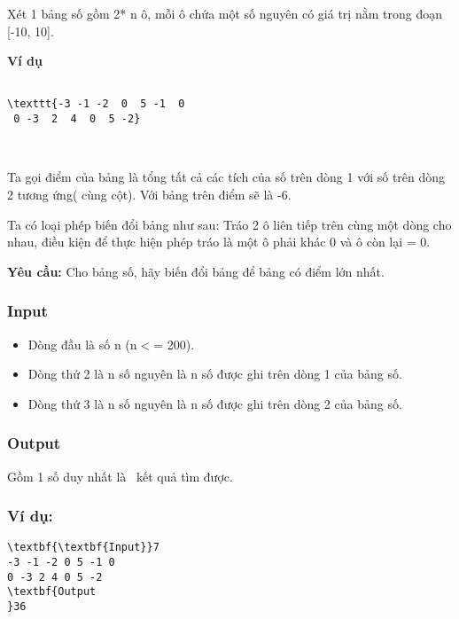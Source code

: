 

Xét 1 bảng số gồm 2* n ô, mỗi ô chứa một số nguyên có giá trị nằm trong đoạn [-10, 10].

\textbf{Ví dụ }
\begin{verbatim}

\texttt{-3 -1 -2  0  5 -1  0
 0 -3  2  4  0  5 -2}\end{verbatim}

 

Ta gọi điểm của bảng là tổng tất cả các tích của số trên dòng 1 với số trên dòng 2 tương ứng( cùng cột). Với bảng trên điểm sẽ là -6.

Ta có loại phép biến đổi bảng như sau: Tráo 2 ô liên tiếp trên cùng một dòng cho nhau, điều kiện để thực hiện phép tráo là một ô phải khác 0 và ô còn lại = 0.

\textbf{Yêu cầu: } Cho bảng số, hãy biến đổi bảng để bảng có điểm lớn nhất.

\subsubsection{Input}
\begin{itemize}
	\item Dòng đầu là số n (n$<$= 200).
	\item Dòng thứ 2 là n số nguyên là n số được ghi trên dòng 1 của bảng số.
	\item Dòng thứ 3 là n số nguyên là n số được ghi trên dòng 2 của bảng số.
\end{itemize}

\subsubsection{Output}

Gồm 1 số duy nhất là  kết quả tìm được.

\subsubsection{Ví dụ:}
\begin{verbatim}
\textbf{\textbf{Input}}7
-3 -1 -2 0 5 -1 0
0 -3 2 4 0 5 -2
\textbf{Output
}36 \end{verbatim}
